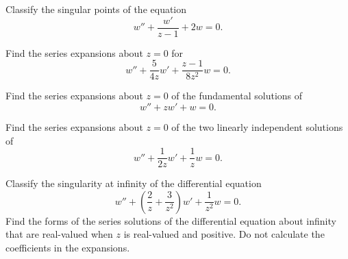 {\begin{Exercise}
\end{Exercise}



\begin{Exercise}
  \label{exercise wwz12w=0}
  Classify the singular points of the equation 
  \[ w'' + \frac{w'}{z-1} + 2w = 0. \]

\end{Exercise}



\begin{Exercise}
  \label{exercise w54zwz18zw=0}
  Find the series expansions about $z = 0$ for
  \[      w'' + \frac{5}{4z} w' + \frac{z-1}{8z^2} w = 0. \]

\end{Exercise}





\begin{Exercise}
  \label{exercise wzww=0}
  Find the series expansions about $z = 0$ of the fundamental solutions of 
  \[ 
  w'' + z w' + w = 0. 
  \]

\end{Exercise}





\begin{Exercise}
  \label{exercise w12zw1zw=0}
  Find the series expansions about $z=0$
  of the two linearly independent solutions of
  \[ 
  w'' + \frac{1}{2z} w' + \frac{1}{z} w = 0. 
  \]

\end{Exercise}




\begin{Exercise}
  \label{exercise w2z3zw1zw=0}
  Classify the singularity at infinity of the differential equation
  \[ 
  w'' + \left(\frac{2}{z}+ \frac{3}{z^2} \right)w' + \frac{1}{z^2} w = 0. 
  \]
  Find the forms of the series solutions of the differential equation about
  infinity that are real-valued when $z$ is real-valued and positive.  
  Do not calculate the coefficients in the expansions.


\end{Exercise}}
